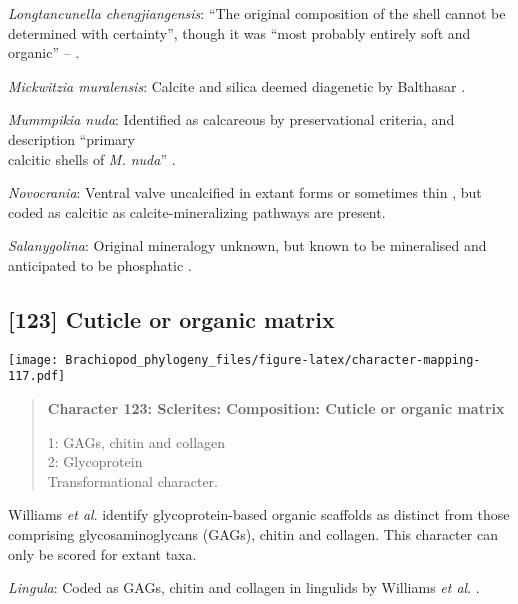 \documentclass[openany]{book}
\theoremstyle{definition}
\theoremstyle{definition}
\theoremstyle{definition}
\theoremstyle{remark}
\begin{document}
\hypertarget{Longtancunella_chengjiangensis-coding-122}{}
\emph{Longtancunella chengjiangensis}: ``The original composition of the
shell cannot be determined with certainty'', though it was ``most
probably entirely soft and organic'' --
\citet{Zhang2011Theexceptionally}.

\hypertarget{Mickwitzia_muralensis-coding-122}{}
\emph{Mickwitzia muralensis}: Calcite and silica deemed diagenetic by
Balthasar \citeyearpar{Balthasar2004Shellstructure}.

\hypertarget{Mummpikia_nuda-coding-122}{}
\emph{Mummpikia nuda}: Identified as calcareous by preservational
criteria, and description ``primary\\
calcitic shells of \emph{M. nuda}'' \citep{Balthasar2008iMummpikia}.

\hypertarget{Novocrania-coding-122}{}
\emph{Novocrania}: Ventral valve uncalcified in extant forms or
sometimes thin \citep{Williams2000LinguliformeaCraniiformea}, but coded
as calcitic as calcite-mineralizing pathways are present.

\hypertarget{Salanygolina-coding-122}{}
\emph{Salanygolina}: Original mineralogy unknown, but known to be
mineralised and anticipated to be phosphatic
\citep{Holmer2009Theenigmatic}.

\subsection*{{[}123{]} Cuticle or organic
matrix}\label{cuticle-or-organic-matrix}

\texttt{[image: Brachiopod\_phylogeny\_files/figure-latex/character-mapping-117.pdf]}

\begin{quote}
\textbf{Character 123: Sclerites: Composition: Cuticle or organic
matrix}

1: GAGs, chitin and collagen\\
2: Glycoprotein\\
Transformational character.
\end{quote}

Williams \emph{et al}. \citeyearpar{Williams1996Asupra} identify
glycoprotein-based organic scaffolds as distinct from those comprising
glycosaminoglycans (GAGs), chitin and collagen. This character can only
be scored for extant taxa.

\hypertarget{Lingula-coding-123}{}
\emph{Lingula}: Coded as GAGs, chitin and collagen in lingulids by
Williams \emph{et al}. \citeyearpar{Williams1996Asupra}.
\end{document}

